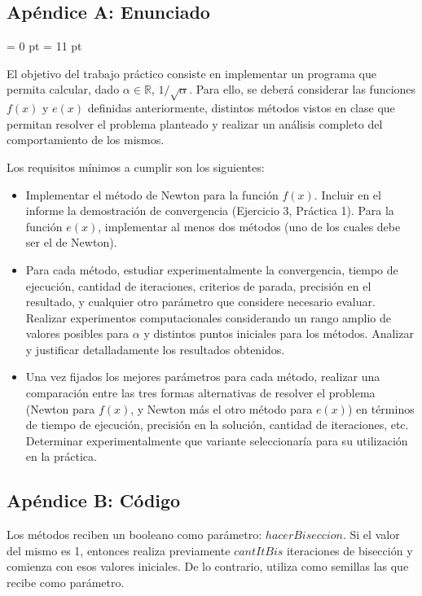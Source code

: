 \subsection{Apéndice A: Enunciado}

\parindent = 0 pt
\parskip = 11 pt

El objetivo del trabajo pr\'actico consiste en implementar un programa que permita calcular, dado $\alpha \in
\mathbb{R}$, $1/\sqrt{\alpha}$. Para ello, se deber\'a considerar las funciones $f(x)$ y $e(x)$ definidas
anteriormente, distintos m\'etodos vistos en clase que permitan resolver el problema planteado y realizar un an\'alisis
completo del comportamiento de los mismos. 

Los requisitos m\'inimos a cumplir son los siguientes:

\begin{itemize}
\item Implementar el m\'etodo de Newton para la funci\'on $f(x)$. Incluir en el informe la demostraci\'on de
convergencia (Ejercicio 3, Pr\'actica 1). Para la funci\'on $e(x)$, implementar al menos dos m\'etodos (uno de los
cuales debe ser el de Newton).   
\item Para cada m\'etodo, estudiar experimentalmente la convergencia, tiempo de ejecuci\'on, cantidad de iteraciones,
criterios de parada, precisi\'on en el resultado, y cualquier otro par\'ametro que considere necesario evaluar. Realizar experimentos
computacionales considerando un rango amplio de valores posibles para $\alpha$ y distintos puntos iniciales
para los m\'etodos. Analizar y justificar detalladamente los resultados obtenidos.
\item Una vez fijados los mejores par\'ametros para cada m\'etodo, realizar una comparaci\'on entre las tres formas
alternativas de resolver el problema (Newton para $f(x)$, y Newton m\'as el otro m\'etodo para $e(x)$) en t\'erminos de
tiempo de ejecuci\'on, precisi\'on en la soluci\'on, cantidad de iteraciones, etc. Determinar experimentalmente que
variante seleccionar\'ia para su utilizaci\'on en la pr\'actica.
\end{itemize}

\subsection{Apéndice B: Código}

Los métodos reciben un booleano como parámetro: $hacerBiseccion$. Si el valor del mismo es 1, entonces realiza previamente
$cantItBis$ iteraciones de bisección y comienza con esos valores iniciales. De lo contrario, utiliza como semillas las que
recibe como parámetro.

